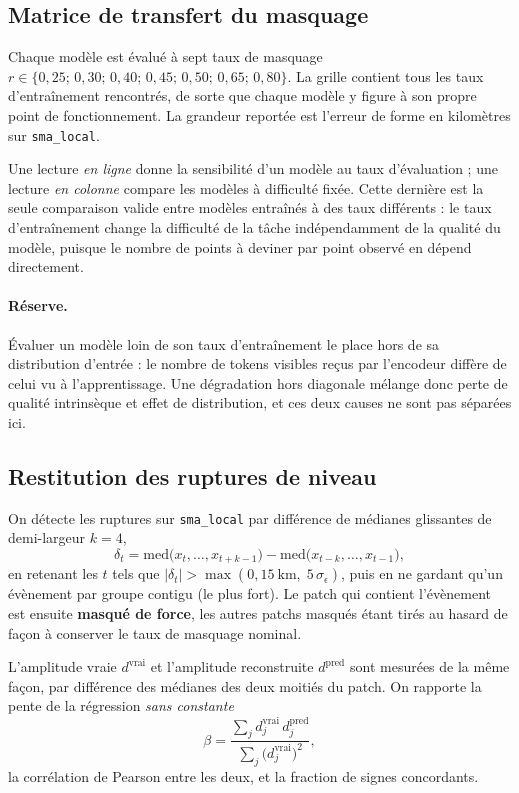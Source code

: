 \documentclass{article}
\begin{document}
\subsection{Matrice de transfert du masquage}

Chaque modèle est évalué à sept taux de masquage $r \in \{0{,}25;\,0{,}30;\,0{,}40;\,0{,}45;\,0{,}50;\,0{,}65;\,0{,}80\}$. La grille contient tous les taux d'entraînement rencontrés, de sorte que chaque modèle y figure à son propre point de fonctionnement. La grandeur reportée est l'erreur de forme en kilomètres sur \texttt{sma\_local}.

Une lecture \emph{en ligne} donne la sensibilité d'un modèle au taux d'évaluation ; une lecture \emph{en colonne} compare les modèles à difficulté fixée. Cette dernière est la seule comparaison valide entre modèles entraînés à des taux différents : le taux d'entraînement change la difficulté de la tâche indépendamment de la qualité du modèle, puisque le nombre de points à deviner par point observé en dépend directement.

\paragraph{Réserve.} Évaluer un modèle loin de son taux d'entraînement le place hors de sa distribution d'entrée : le nombre de tokens visibles reçus par l'encodeur diffère de celui vu à l'apprentissage. Une dégradation hors diagonale mélange donc perte de qualité intrinsèque et effet de distribution, et ces deux causes ne sont pas séparées ici.

\subsection{Restitution des ruptures de niveau}

On détecte les ruptures sur \texttt{sma\_local} par différence de médianes glissantes de demi-largeur $k=4$,
\begin{equation}
\delta_t = \mathrm{med}\bigl(x_{t},\dots,x_{t+k-1}\bigr) - \mathrm{med}\bigl(x_{t-k},\dots,x_{t-1}\bigr),
\end{equation}
en retenant les $t$ tels que $|\delta_t| > \max(0{,}15~\text{km},\; 5\,\hat{\sigma}_\epsilon)$, puis en ne gardant qu'un évènement par groupe contigu (le plus fort). Le patch qui contient l'évènement est ensuite \textbf{masqué de force}, les autres patchs masqués étant tirés au hasard de façon à conserver le taux de masquage nominal.

L'amplitude vraie $d^{\text{vrai}}$ et l'amplitude reconstruite $d^{\text{pred}}$ sont mesurées de la même façon, par différence des médianes des deux moitiés du patch. On rapporte la pente de la régression \emph{sans constante}
\begin{equation}
\beta = \frac{\sum_j d^{\text{vrai}}_j\, d^{\text{pred}}_j}{\sum_j \bigl(d^{\text{vrai}}_j\bigr)^2},
\end{equation}
la corrélation de Pearson entre les deux, et la fraction de signes concordants.
\end{document}
